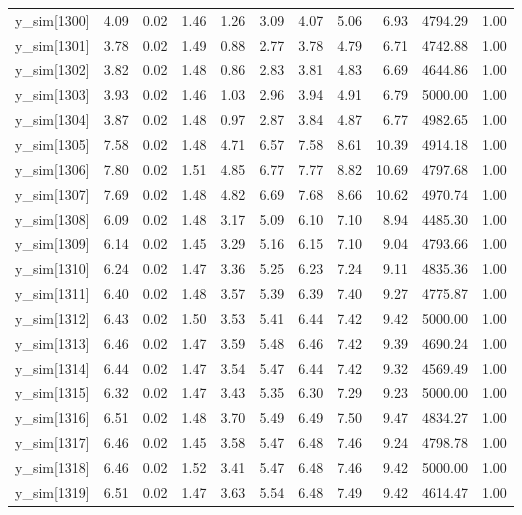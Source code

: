 \begin{table}[ht]
\begin{tabular}{rrrrrrrrrrr}
  y\_sim[1300] & 4.09 & 0.02 & 1.46 & 1.26 & 3.09 & 4.07 & 5.06 & 6.93 & 4794.29 & 1.00 \\ 
  y\_sim[1301] & 3.78 & 0.02 & 1.49 & 0.88 & 2.77 & 3.78 & 4.79 & 6.71 & 4742.88 & 1.00 \\ 
  y\_sim[1302] & 3.82 & 0.02 & 1.48 & 0.86 & 2.83 & 3.81 & 4.83 & 6.69 & 4644.86 & 1.00 \\ 
  y\_sim[1303] & 3.93 & 0.02 & 1.46 & 1.03 & 2.96 & 3.94 & 4.91 & 6.79 & 5000.00 & 1.00 \\ 
  y\_sim[1304] & 3.87 & 0.02 & 1.48 & 0.97 & 2.87 & 3.84 & 4.87 & 6.77 & 4982.65 & 1.00 \\ 
  y\_sim[1305] & 7.58 & 0.02 & 1.48 & 4.71 & 6.57 & 7.58 & 8.61 & 10.39 & 4914.18 & 1.00 \\ 
  y\_sim[1306] & 7.80 & 0.02 & 1.51 & 4.85 & 6.77 & 7.77 & 8.82 & 10.69 & 4797.68 & 1.00 \\ 
  y\_sim[1307] & 7.69 & 0.02 & 1.48 & 4.82 & 6.69 & 7.68 & 8.66 & 10.62 & 4970.74 & 1.00 \\ 
  y\_sim[1308] & 6.09 & 0.02 & 1.48 & 3.17 & 5.09 & 6.10 & 7.10 & 8.94 & 4485.30 & 1.00 \\ 
  y\_sim[1309] & 6.14 & 0.02 & 1.45 & 3.29 & 5.16 & 6.15 & 7.10 & 9.04 & 4793.66 & 1.00 \\ 
  y\_sim[1310] & 6.24 & 0.02 & 1.47 & 3.36 & 5.25 & 6.23 & 7.24 & 9.11 & 4835.36 & 1.00 \\ 
  y\_sim[1311] & 6.40 & 0.02 & 1.48 & 3.57 & 5.39 & 6.39 & 7.40 & 9.27 & 4775.87 & 1.00 \\ 
  y\_sim[1312] & 6.43 & 0.02 & 1.50 & 3.53 & 5.41 & 6.44 & 7.42 & 9.42 & 5000.00 & 1.00 \\ 
  y\_sim[1313] & 6.46 & 0.02 & 1.47 & 3.59 & 5.48 & 6.46 & 7.42 & 9.39 & 4690.24 & 1.00 \\ 
  y\_sim[1314] & 6.44 & 0.02 & 1.47 & 3.54 & 5.47 & 6.44 & 7.42 & 9.32 & 4569.49 & 1.00 \\ 
  y\_sim[1315] & 6.32 & 0.02 & 1.47 & 3.43 & 5.35 & 6.30 & 7.29 & 9.23 & 5000.00 & 1.00 \\ 
  y\_sim[1316] & 6.51 & 0.02 & 1.48 & 3.70 & 5.49 & 6.49 & 7.50 & 9.47 & 4834.27 & 1.00 \\ 
  y\_sim[1317] & 6.46 & 0.02 & 1.45 & 3.58 & 5.47 & 6.48 & 7.46 & 9.24 & 4798.78 & 1.00 \\ 
  y\_sim[1318] & 6.46 & 0.02 & 1.52 & 3.41 & 5.47 & 6.48 & 7.46 & 9.42 & 5000.00 & 1.00 \\ 
  y\_sim[1319] & 6.51 & 0.02 & 1.47 & 3.63 & 5.54 & 6.48 & 7.49 & 9.42 & 4614.47 & 1.00 \\ 

\end{tabular}
\end{table}

